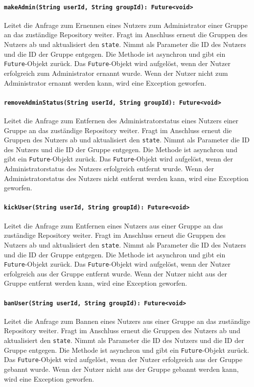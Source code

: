\documentclass{entwurfsheft}
\begin{document}
\paragraph{\texttt{makeAdmin(String userId, String groupId): Future<void>}}
Leitet die Anfrage zum Ernennen eines Nutzers zum Administrator einer Gruppe an das zuständige Repository weiter. Fragt im Anschluss erneut die Gruppen des Nutzers ab und aktualisiert den \texttt{state}. Nimmt als Parameter die ID des Nutzers und die ID der Gruppe entgegen. Die Methode ist asynchron und gibt ein \texttt{Future}-Objekt zurück. Das \texttt{Future}-Objekt wird aufgelöst, wenn der Nutzer erfolgreich zum Administrator ernannt wurde. Wenn der Nutzer nicht zum Administrator ernannt werden kann, wird eine Exception geworfen.
\paragraph{\texttt{removeAdminStatus(String userId, String groupId): Future<void>}}
Leitet die Anfrage zum Entfernen des Administratorstatus eines Nutzers einer Gruppe an das zuständige Repository weiter. Fragt im Anschluss erneut die Gruppen des Nutzers ab und aktualisiert den \texttt{state}. Nimmt als Parameter die ID des Nutzers und die ID der Gruppe entgegen. Die Methode ist asynchron und gibt ein \texttt{Future}-Objekt zurück. Das \texttt{Future}-Objekt wird aufgelöst, wenn der Administratorstatus des Nutzers erfolgreich entfernt wurde. Wenn der Administratorstatus des Nutzers nicht entfernt werden kann, wird eine Exception geworfen.
\paragraph{\texttt{kickUser(String userId, String groupId): Future<void>}}
Leitet die Anfrage zum Entfernen eines Nutzers aus einer Gruppe an das zuständige Repository weiter. Fragt im Anschluss erneut die Gruppen des Nutzers ab und aktualisiert den \texttt{state}. Nimmt als Parameter die ID des Nutzers und die ID der Gruppe entgegen. Die Methode ist asynchron und gibt ein \texttt{Future}-Objekt zurück. Das \texttt{Future}-Objekt wird aufgelöst, wenn der Nutzer erfolgreich aus der Gruppe entfernt wurde. Wenn der Nutzer nicht aus der Gruppe entfernt werden kann, wird eine Exception geworfen.
\paragraph{\texttt{banUser(String userId, String groupId): Future<void>}}
Leitet die Anfrage zum Bannen eines Nutzers aus einer Gruppe an das zuständige Repository weiter. Fragt im Anschluss erneut die Gruppen des Nutzers ab und aktualisiert den \texttt{state}. Nimmt als Parameter die ID des Nutzers und die ID der Gruppe entgegen. Die Methode ist asynchron und gibt ein \texttt{Future}-Objekt zurück. Das \texttt{Future}-Objekt wird aufgelöst, wenn der Nutzer erfolgreich aus der Gruppe gebannt wurde. Wenn der Nutzer nicht aus der Gruppe gebannt werden kann, wird eine Exception geworfen.
\end{document}
